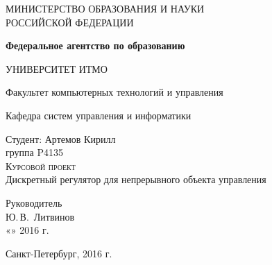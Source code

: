 \documentclass[a4paper,14pt]{extreport}
\begin{document}
	
\begin{titlepage}

	\begin{center}
		\large
		МИНИСТЕРСТВО ОБРАЗОВАНИЯ И НАУКИ\\ РОССИЙСКОЙ ФЕДЕРАЦИИ
		
		\textbf{Федеральное агентство по образованию}
		\vspace{0.5cm}
		
		УНИВЕРСИТЕТ ИТМО
		\vspace{0.25cm}
		
		Факультет компьютерных технологий и управления
		
		Кафедра систем управления и информатики
		\vfill
		
		
		Студент: Артемов Кирилл\\
		группа P4135\\
		
		\textsc{Курсовой проект}\\[5mm]
		
		{\LARGE Дискретный регулятор для непрерывного объекта управления }
		\bigskip
		
	\end{center}
	\vfill
	
	\newlength{\ML}
	\hfill\begin{minipage}{0.4\textwidth}
		Руководитель\\
		\underline{\hspace{\ML}} Ю.\,В.~Литвинов\\
		«\underline{\hspace{0.7cm}}» \underline{\hspace{2cm}} 2016 г.
	\end{minipage}%
	\bigskip
	
	\vfill
	
	\begin{center}
		Санкт-Петербург, 2016 г.
	\end{center}
\end{titlepage}
\end{document}
